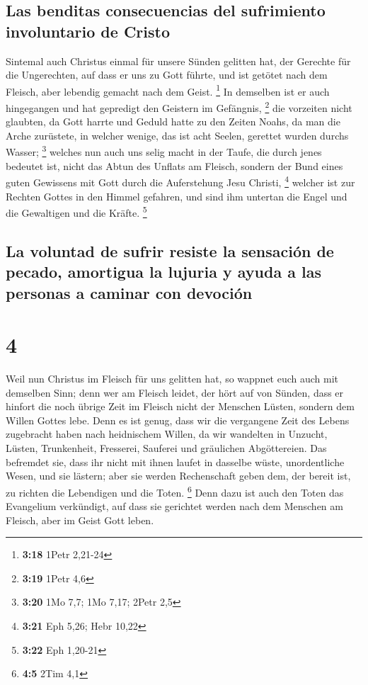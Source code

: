 \hypertarget{las-benditas-consecuencias-del-sufrimiento-involuntario-de-cristo}{%
\subsection{Las benditas consecuencias del sufrimiento involuntario de
Cristo}\label{las-benditas-consecuencias-del-sufrimiento-involuntario-de-cristo}}

 Sintemal auch Christus einmal für unsere Sünden gelitten
hat, der Gerechte für die Ungerechten, auf dass er uns zu Gott führte,
und ist getötet nach dem Fleisch, aber lebendig gemacht nach dem Geist.
\footnote{\textbf{3:18} 1Petr 2,21-24}  In demselben ist
er auch hingegangen und hat gepredigt den Geistern im Gefängnis,
\footnote{\textbf{3:19} 1Petr 4,6}  die vorzeiten nicht
glaubten, da Gott harrte und Geduld hatte zu den Zeiten Noahs, da man
die Arche zurüstete, in welcher wenige, das ist acht Seelen, gerettet
wurden durchs Wasser; \footnote{\textbf{3:20} 1Mo 7,7; 1Mo 7,17; 2Petr
  2,5}  welches nun auch uns selig macht in der Taufe,
die durch jenes bedeutet ist, nicht das Abtun des Unflats am Fleisch,
sondern der Bund eines guten Gewissens mit Gott durch die Auferstehung
Jesu Christi, \footnote{\textbf{3:21} Eph 5,26; Hebr 10,22}
 welcher ist zur Rechten Gottes in den Himmel gefahren,
und sind ihm untertan die Engel und die Gewaltigen und die Kräfte.
\footnote{\textbf{3:22} Eph 1,20-21}

\hypertarget{la-voluntad-de-sufrir-resiste-la-sensaciuxf3n-de-pecado-amortigua-la-lujuria-y-ayuda-a-las-personas-a-caminar-con-devociuxf3n}{%
\subsection{La voluntad de sufrir resiste la sensación de pecado,
amortigua la lujuria y ayuda a las personas a caminar con
devoción}\label{la-voluntad-de-sufrir-resiste-la-sensaciuxf3n-de-pecado-amortigua-la-lujuria-y-ayuda-a-las-personas-a-caminar-con-devociuxf3n}}

\hypertarget{section-3}{%
\section{4}\label{section-3}}

 Weil nun Christus im Fleisch für uns gelitten hat, so
wappnet euch auch mit demselben Sinn; denn wer am Fleisch leidet, der
hört auf von Sünden,  dass er hinfort die noch übrige Zeit
im Fleisch nicht der Menschen Lüsten, sondern dem Willen Gottes lebe.
 Denn es ist genug, dass wir die vergangene Zeit des
Lebens zugebracht haben nach heidnischem Willen, da wir wandelten in
Unzucht, Lüsten, Trunkenheit, Fresserei, Sauferei und gräulichen
Abgöttereien.  Das befremdet sie, dass ihr nicht mit ihnen
laufet in dasselbe wüste, unordentliche Wesen, und sie lästern;
 aber sie werden Rechenschaft geben dem, der bereit ist,
zu richten die Lebendigen und die Toten. \footnote{\textbf{4:5} 2Tim 4,1}
 Denn dazu ist auch den Toten das Evangelium verkündigt,
auf dass sie gerichtet werden nach dem Menschen am Fleisch, aber im
Geist Gott leben.

